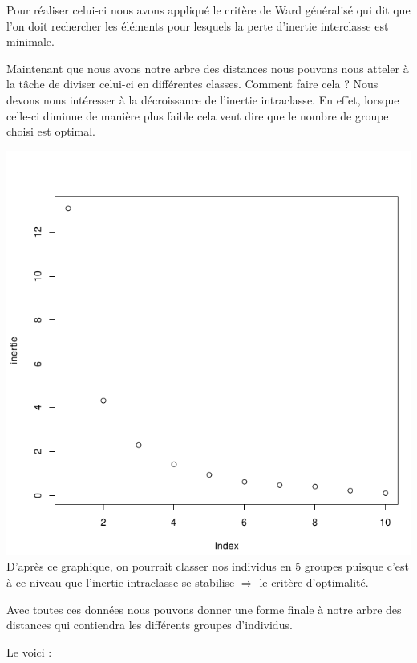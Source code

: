 \documentclass{article}
\begin{document}
	Pour réaliser celui-ci nous avons appliqué le critère de Ward généralisé qui dit que l'on doit rechercher les éléments pour lesquels la perte d'inertie interclasse est minimale.
	
	
	Maintenant que nous avons notre arbre des distances nous pouvons nous atteler à la tâche de diviser celui-ci en différentes classes. Comment faire cela ? Nous devons nous intéresser à la décroissance de l'inertie intraclasse. En effet, lorsque celle-ci diminue de manière plus faible cela veut dire que le nombre de groupe choisi est optimal.
	
	\includegraphics[width=\textwidth]{Inertie}
	\newpage
	D'après ce graphique, on pourrait classer nos individus en 5 groupes puisque c'est à ce niveau que l'inertie intraclasse se stabilise $\Rightarrow$ le critère d'optimalité.
	
	Avec toutes ces données nous pouvons donner une forme finale à notre arbre des distances qui contiendra les différents groupes d'individus.
	
	Le voici : 
	
\end{document}
